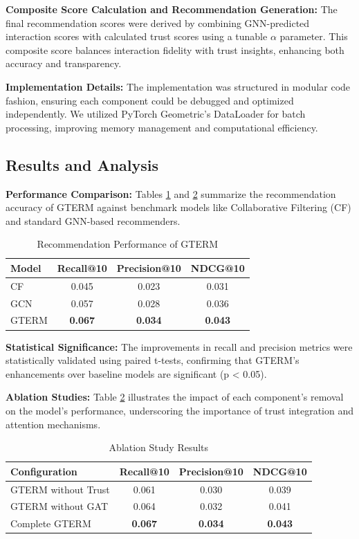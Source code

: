 \documentclass{article} %
\begin{document}
\textbf{Composite Score Calculation and Recommendation Generation:} The final recommendation scores were derived by combining GNN-predicted interaction scores with calculated trust scores using a tunable \(\alpha\) parameter. This composite score balances interaction fidelity with trust insights, enhancing both accuracy and transparency.

\textbf{Implementation Details:} The implementation was structured in modular code fashion, ensuring each component could be debugged and optimized independently. We utilized PyTorch Geometric's DataLoader for batch processing, improving memory management and computational efficiency.

\subsection{Results and Analysis}

\textbf{Performance Comparison:} Tables \ref{tab:performance} and \ref{tab:ablation} summarize the recommendation accuracy of GTERM against benchmark models like Collaborative Filtering (CF) and standard GNN-based recommenders.



\begin{table}[h] 
\centering 
\label{tab:performance} 
\begin{tabular}{lccc} 
\hline Model & Recall@10 & Precision@10 & NDCG@10 \\ 
\hline 
CF & 0.045 & 0.023 & 0.031 \\ 
GCN & 0.057 & 0.028 & 0.036 \\ 
GTERM & \textbf{0.067} & \textbf{0.034} & \textbf{0.043} \\ 
\hline 
\end{tabular} 
\caption{Recommendation Performance of GTERM} 
\end{table}
\textbf{Statistical Significance:} The improvements in recall and precision metrics were statistically validated using paired t-tests, confirming that GTERM's enhancements over baseline models are significant (p < 0.05).

\textbf{Ablation Studies:} Table \ref{tab:ablation} illustrates the impact of each component's removal on the model's performance, underscoring the importance of trust integration and attention mechanisms.

\begin{table}[h]
\centering
\label{tab:ablation}
\begin{tabular}{lccc}
\hline
Configuration & Recall@10 & Precision@10 & NDCG@10 \\
\hline
GTERM without Trust & 0.061 & 0.030 & 0.039 \\
GTERM without GAT & 0.064 & 0.032 & 0.041 \\
Complete GTERM & \textbf{0.067} & \textbf{0.034} & \textbf{0.043} \\
\hline
\end{tabular}
\caption{Ablation Study Results}
\end{table}
\end{document}
